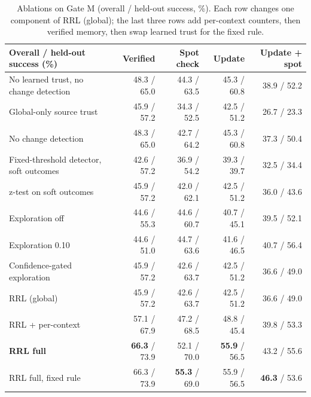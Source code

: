 \begin{table}[t]
\centering
\small
\begin{tabular}{lrrrr}
\toprule
Overall / held-out success (\%) & Verified & Spot check & Update & Update + spot \\
\midrule
No learned trust, no change detection & 48.3 / 65.0 & 44.3 / 63.5 & 45.3 / 60.8 & 38.9 / 52.2 \\
Global-only source trust & 45.9 / 57.2 & 34.3 / 52.5 & 42.5 / 51.2 & 26.7 / 23.3 \\
No change detection & 48.3 / 65.0 & 42.7 / 64.2 & 45.3 / 60.8 & 37.3 / 50.4 \\
Fixed-threshold detector, soft outcomes & 42.6 / 57.2 & 36.9 / 54.2 & 39.3 / 39.7 & 32.5 / 34.4 \\
z-test on soft outcomes & 45.9 / 57.2 & 42.0 / 62.1 & 42.5 / 51.2 & 36.0 / 43.6 \\
Exploration off & 44.6 / 55.3 & 44.6 / 60.7 & 40.7 / 45.1 & 39.5 / 52.1 \\
Exploration 0.10 & 44.6 / 51.0 & 44.7 / 63.6 & 41.6 / 46.5 & 40.7 / 56.4 \\
Confidence-gated exploration & 45.9 / 57.2 & 42.6 / 63.7 & 42.5 / 51.2 & 36.6 / 49.0 \\
RRL (global) & 45.9 / 57.2 & 42.6 / 63.7 & 42.5 / 51.2 & 36.6 / 49.0 \\
RRL + per-context & 57.1 / 67.9 & 47.2 / 68.5 & 48.8 / 45.4 & 39.8 / 53.3 \\
\textbf{RRL full} & \textbf{66.3} / 73.9 & 52.1 / 70.0 & \textbf{55.9} / 56.5 & 43.2 / 55.6 \\
RRL full, fixed rule & 66.3 / 73.9 & \textbf{55.3} / 69.0 & 55.9 / 56.5 & \textbf{46.3} / 53.6 \\
\bottomrule
\end{tabular}
\caption{Ablations on Gate M (overall / held-out success, \%). Each row changes one component of RRL (global); the last three rows add per-context counters, then verified memory, then swap learned trust for the fixed rule.}
\label{tab:ablation}
\end{table}

